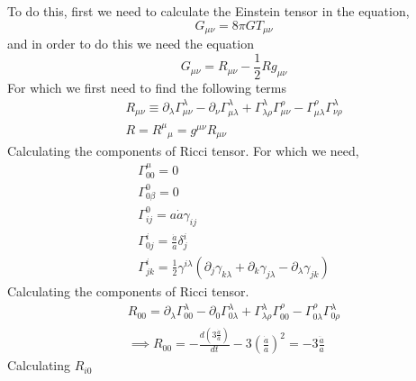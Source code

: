 \documentclass[12pt]{report}
\newcommand{\de}[2]{\frac{d{#1}}{d{#2}}}
\newcommand{\ch}[2]{\Gamma^{#1}_{#2}}
\newcommand{\p}{\partial}
\begin{document}
To do this, first we need to calculate the Einstein tensor in the equation,
\begin{equation*}
G_{\mu \nu}=8 \pi G T_{\mu \nu}
\end{equation*}
and in order to do this we need the equation
\begin{equation}
G_{\mu \nu}= R_{\mu \nu} - \frac{1}{2}R g_{\mu \nu}
\end{equation}
For which we first need to find the following terms
\begin{eqnarray}
R_{\mu \nu} \equiv \p_{\lambda}\ch{\lambda}{\mu \nu} - \p_{\nu}\ch{\lambda}{\mu \lambda} + \ch{\lambda}{\lambda \rho}\ch{\rho}{\mu \nu} - \ch{\rho}{\mu \lambda}\ch{\lambda}{\nu \rho} \\
R = {R^\mu }_\mu = g^{\mu \nu} R_{\mu \nu}
\end{eqnarray}
Calculating the components of Ricci tensor. For which we need,
\begin{eqnarray*}
\ch{\mu}{00}= 0\\
\ch{0}{0 \beta}=0\\
\ch{0}{ij}=a \dot{a} \gamma_{ij}\\
\ch{i}{0 j}=  \frac{\dot{a}}{a } \delta^i_j\\
\ch{i}{j k}=\frac{1}{2} \gamma^{i \lambda}(\p_{j} \gamma_{k \lambda}+\p_k  \gamma_{j \lambda} - \p_\lambda  \gamma_{j k})
\end{eqnarray*}
Calculating the components of Ricci tensor. 
\begin{eqnarray*}
R_{00}=\p_{\lambda}\ch{\lambda}{00} - \p_{0}\ch{\lambda}{0 \lambda} + \ch{\lambda}{\lambda \rho}\ch{\rho}{00} - \ch{\rho}{0 \lambda}\ch{\lambda}{0 \rho} \\
\implies R_{00}=-\de{(3\frac{\dot{a}}{a})}{t}-3\left({\frac{\dot{a}}{a}}\right)^2= -3 \frac{\ddot{a}}{a}
\end{eqnarray*}
Calculating $R_{i0}$
\end{document}
